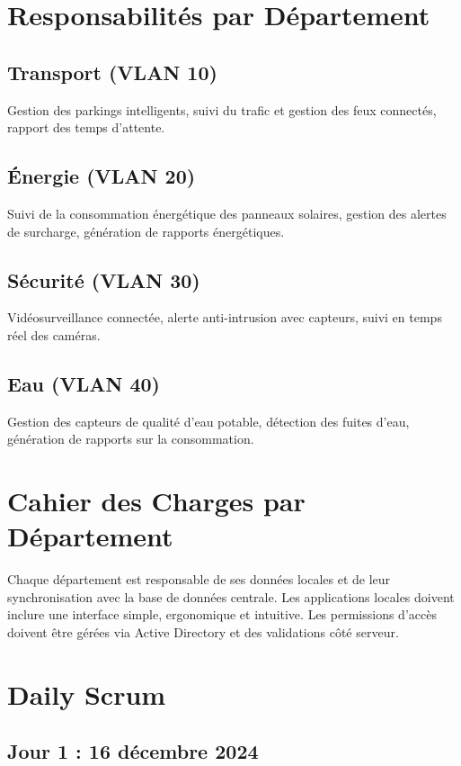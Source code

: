 \documentclass[a4paper,12pt]{report}
\begin{document}
\chapter{Responsabilités par Département}
\section{Transport (VLAN 10)}
Gestion des parkings intelligents, suivi du trafic et gestion des feux connectés, rapport des temps d'attente.

\section{Énergie (VLAN 20)}
Suivi de la consommation énergétique des panneaux solaires, gestion des alertes de surcharge, génération de rapports énergétiques.

\section{Sécurité (VLAN 30)}
Vidéosurveillance connectée, alerte anti-intrusion avec capteurs, suivi en temps réel des caméras.

\section{Eau (VLAN 40)}
Gestion des capteurs de qualité d'eau potable, détection des fuites d'eau, génération de rapports sur la consommation.

\chapter{Cahier des Charges par Département}
Chaque département est responsable de ses données locales et de leur synchronisation avec la base de données centrale. Les applications locales doivent inclure une interface simple, ergonomique et intuitive. Les permissions d'accès doivent être gérées via Active Directory et des validations côté serveur.

\chapter{Daily Scrum}

\section{Jour 1 : 16 décembre 2024}
\end{document}
